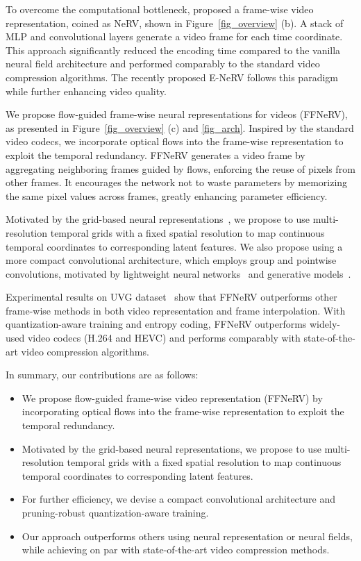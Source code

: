 \documentclass[sigconf]{acmart}
\begin{document}
To overcome the computational bottleneck, \citet{nerv} proposed a frame-wise video representation, coined as NeRV, shown in Figure~\ref{fig_overview} (b).
A stack of MLP and convolutional layers generate a video frame for each time coordinate.
This approach significantly reduced the encoding time compared to the vanilla neural field architecture and performed comparably to the standard video compression algorithms.
The recently proposed E-NeRV \cite{enerv} follows this paradigm while further enhancing video quality. 

We propose flow-guided frame-wise neural representations for videos (FFNeRV), as presented in Figure~\ref{fig_overview} (c) and \ref{fig_arch}.
Inspired by the standard video codecs, we incorporate optical flows into the frame-wise representation to exploit the temporal redundancy.
FFNeRV generates a video frame by aggregating neighboring frames guided by flows, enforcing the reuse of pixels from other frames.
It encourages the network not to waste parameters by memorizing the same pixel values across frames, greatly enhancing parameter efficiency.

Motivated by the grid-based neural representations~\cite{loc_grid_3dscene,plenoxels,tensorf}, we propose to use multi-resolution temporal grids with a fixed spatial resolution to map continuous temporal coordinates to corresponding latent features.
We also propose using a more compact convolutional architecture, which employs group and pointwise convolutions, motivated by lightweight neural networks~\cite{mobilenet,mnasnet,efficientnet} and generative models~\cite{stylegan3}.

Experimental results on UVG dataset~\cite{uvg} show that FFNeRV outperforms other frame-wise methods in both video representation and frame interpolation.
With quantization-aware training and entropy coding, FFNeRV outperforms widely-used video codecs (H.264 and HEVC) and performs comparably with state-of-the-art video compression algorithms.

In summary, our contributions are as follows:
\begin{itemize}
    \item We propose flow-guided frame-wise video representation (FFNeRV) by incorporating optical flows into the frame-wise representation to exploit the temporal redundancy.
    \item Motivated by the grid-based neural representations, we propose to use multi-resolution temporal grids with a fixed spatial resolution to map continuous temporal coordinates to corresponding latent features.
    \item For further efficiency, we devise a compact convolutional architecture and pruning-robust quantization-aware training.
    \item Our approach outperforms others using neural representation or neural fields, while achieving on par with state-of-the-art video compression methods.
\end{itemize}
\end{document}
